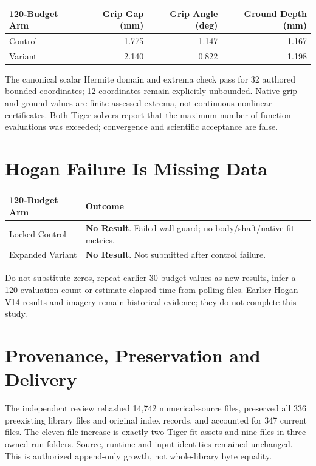 \documentclass[11pt,letterpaper]{article}
\begin{document}
\begin{center}
\begin{tabular}{@{}lrrr@{}}\toprule
120-Budget Arm & Grip Gap (mm) & Grip Angle (deg) & Ground Depth (mm)\\\midrule
Control & 1.775 & 1.147 & 1.167 \\
Variant & 2.140 & 0.822 & 1.198 \\
\bottomrule\end{tabular}
\end{center}
The canonical scalar Hermite domain and extrema check pass for 32 authored bounded
coordinates; 12 coordinates remain explicitly unbounded. Native grip and ground
values are finite assessed extrema, not continuous nonlinear certificates. Both
Tiger solvers report that the maximum number of function evaluations was exceeded;
convergence and scientific acceptance are false.

\section{Hogan Failure Is Missing Data}
\begin{tabular}{@{}p{.34\linewidth}p{.59\linewidth}@{}}\toprule
120-Budget Arm & Outcome\\\midrule
Locked Control & \textbf{No Result}. Failed wall guard; no body/shaft/native fit metrics.\\
Expanded Variant & \textbf{No Result}. Not submitted after control failure.\\\bottomrule
\end{tabular}

Do not substitute zeros, repeat earlier 30-budget values as new results, infer a
120-evaluation count or estimate elapsed time from polling files. Earlier Hogan
V14 results and imagery remain historical evidence; they do not complete this study.
\newpage
\section{Provenance, Preservation and Delivery}
The independent review rehashed 14,742 numerical-source files, preserved all 336
preexisting library files and original index records, and accounted for 347 current
files. The eleven-file increase is exactly two Tiger fit assets and nine files in
three owned run folders. Source, runtime and input identities remained unchanged.
This is authorized append-only growth, not whole-library byte equality.
\end{document}
